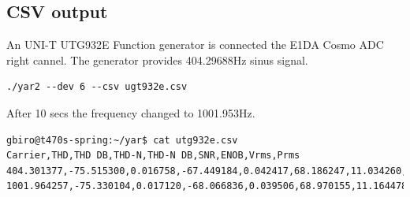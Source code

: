 \documentclass[10pt,a4paper]{article}
\begin{document}
\subsection{CSV output}
An UNI-T UTG932E Function generator is connected the E1DA Cosmo ADC right cannel. The generator provides 404.29688Hz sinus signal.
\begin{verbatim}
./yar2 --dev 6 --csv ugt932e.csv
\end{verbatim}
After 10 secs the frequency changed to 1001.953Hz.
\begin{verbatim}
gbiro@t470s-spring:~/yar$ cat utg932e.csv 
Carrier,THD,THD DB,THD-N,THD-N DB,SNR,ENOB,Vrms,Prms
404.301377,-75.515300,0.016758,-67.449184,0.042417,68.186247,11.034260,0.425204,0.022600
1001.964257,-75.330104,0.017120,-68.066836,0.039506,68.970155,11.164478,0.424833,0.022560
\end{verbatim}
\end{document}
